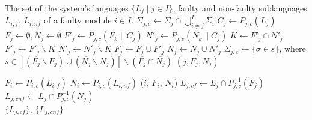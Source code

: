 \begin{alg}[!ht]
\caption{Forward propagation of a fault. Computes co-faulty and
co-non-faulty languages of all the modules}
\begin{algorithmic}[1]
	\Require The set of the system's languages $\{L_j\mid j \in I\}$, faulty and
	non-faulty sublanguages $L_{i,f}$, $L_{i,nf}$ of a faulty module $i\in I$.
	\label{alg:fcf_init}
		\State $\Sigma_{j,c} \leftarrow \Sigma_j \cap \bigcup_{i\neq j}^I\Sigma_i$
		\State $C_j \leftarrow P_{j,c}(L_j)$
		\State $F_j \leftarrow \emptyset, N_j \leftarrow \emptyset$
	\EndFor
			\State $F'_j \leftarrow P_{j,c}(F_k \parallel C_j)$
			\label{alg:fcf_partial_begin}
			\State $N'_j \leftarrow P_{j,c}(N_k \parallel C_j)$ 
			\State $K \leftarrow \overline{F'_j \cap N'_j}$
			\State $F'_j \leftarrow F'_j \backslash K$
			\State $N'_j \leftarrow N'_j \backslash K$
			\label{alg:fcf_partial_end}
				\label{alg:fcf_update}
				\State $F_j \leftarrow F_j \cup F'_j$
				\State $N_j \leftarrow N_j \cup N'_j$
				\State $\Sigma_{j,c} \leftarrow
					\{\sigma \in s \}$, where
				\State $s \in
						\left[(\overline{F_j} \backslash F_j) \cup
						(\overline{N_j} \backslash N_j)\right] \backslash	
						(\overline{F_j} \cap \overline{N_j})
						$
				\State {}$(j, F_j, N_j)$
			\EndIf
		\EndFor
	\EndProcedure
	
	\State $F_i \leftarrow P_{i,c}(L_{i,f})$
		\label{alg:fcf_Fi}
	\State $N_i \leftarrow P_{i,c}(L_{i,nf})$
	\State {}($i$, $F_i$, $N_i$)
		\label{alg:fcf_final}
		\State $L_{j,cf} \leftarrow L_j \cap P_{j,c}^{-1}(F_j)$
		\State $L_{j,cnf} \leftarrow L_j \cap P_{j,c}^{-1}(N_j)$
	\EndFor
	\\
	\Return $\{L_{j,cf}\}$, $\{L_{j,cnf}\}$
\end{algorithmic}
\label{alg:propagate_fn}
\end{alg}


